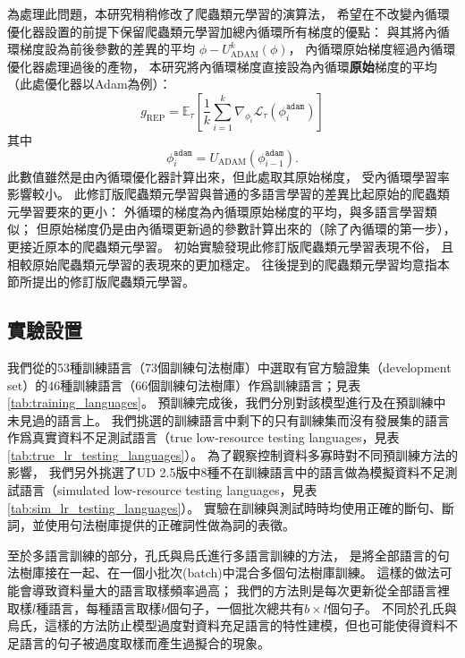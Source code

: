 為處理此問題，本研究稍稍修改了爬蟲類元學習的演算法，
希望在不改變內循環優化器設置的前提下保留爬蟲類元學習加總內循環所有梯度的優點：
與其將內循環梯度設為前後參數的差異的平均 $\phi - U_{\textrm{ADAM}}^{k}(\phi) $，
內循環原始梯度經過內循環優化器處理過後的產物，
本研究將內循環梯度直接設為內循環\textbf{原始}梯度的平均（此處優化器以Adam為例）：
\begin{equation}
    g_{\textrm{REP}} = \mathbb{E}_{\tau}\left[ \frac{1}{k} \sum_{i=1}^{k} \nabla_{\phi_{i}} \mathcal{L}_{\tau} \left( \phi_{i}^{\texttt{adam}} \right) \right]
\end{equation}
其中
\begin{equation}
    \phi_{i}^{\texttt{adam}} = U_{\textrm{ADAM}} \left( \phi_{i - 1}^{\texttt{adam}} \right).
\end{equation}
此數值雖然是由內循環優化器計算出來，但此處取其原始梯度，
受內循環學習率影響較小。
此修訂版爬蟲類元學習與普通的多語言學習的差異比起原始的爬蟲類元學習要來的更小：
外循環的梯度為內循環原始梯度的平均，與多語言學習類似；
但原始梯度仍是由內循環更新過的參數計算出來的（除了內循環的第一步），更接近原本的爬蟲類元學習。
初始實驗發現此修訂版爬蟲類元學習表現不俗，
且相較原始爬蟲類元學習的表現來的更加穩定。
往後提到的爬蟲類元學習均意指本節所提出的修訂版爬蟲類元學習。

\subsection{實驗設置}
\label{subsec:delex_depparse_setting}


我們從\conll 的53種訓練語言（73個訓練句法樹庫）中選取有官方驗證集（development set）的46種訓練語言（66個訓練句法樹庫）作爲訓練語言；見表\ref{tab:training_languages}。
預訓練完成後，我們分別對該模型進行\zeroshot 及\finetune 在預訓練中未見過的語言上。
我們挑選\conll 的訓練語言中剩下的只有訓練集而沒有發展集的語言作爲真實資料不足測試語言（true low-resource testing languages，見表\ref{tab:true_lr_testing_languages}）。
為了觀察控制資料多寡時對不同預訓練方法的影響，
我們另外挑選了UD 2.5版中8種不在訓練語言中的語言做為模擬資料不足測試語言（simulated low-resource testing languages，見表\ref{tab:sim_lr_testing_languages}）。
實驗在訓練與測試時時均使用正確的斷句、斷詞，並使用句法樹庫提供的正確詞性做為詞的表徵。

至於多語言訓練的部分，孔氏\cite{kondratyuk-straka-2019-75}與烏氏\cite{ustun2020udapter}進行多語言訓練的方法，
是將全部語言的句法樹庫接在一起、在一個小批次(batch)中混合多個句法樹庫訓練。
這樣的做法可能會導致資料量大的語言取樣頻率過高；
我們的方法則是每次更新從全部語言裡取樣$l$種語言，每種語言取樣$b$個句子，一個批次總共有$b \times l$個句子。
不同於孔氏與烏氏，這樣的方法防止模型過度對資料充足語言的特性建模，但也可能使得資料不足語言的句子被過度取樣而產生過擬合的現象。

